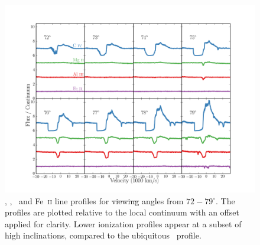 \documentclass[preprint, a4paper, 11pt]{aastex}
\providecommand{\DIFadd}[1]{{\protect\color{blue}\uwave{#1}}} %
\providecommand{\DIFdel}[1]{{\protect\color{red}\sout{#1}}}                      %
\providecommand{\DIFaddFL}[1]{\DIFadd{#1}} %
\providecommand{\DIFdelFL}[1]{\DIFdel{#1}} %
\providecommand{\DIFaddbeginFL}{} %
\providecommand{\DIFaddendFL}{} %
\providecommand{\DIFdelbeginFL}{} %
\providecommand{\DIFdelendFL}{} %
\begin{document}
\begin{figure} %
\centering
\includegraphics[width=1.0\textwidth]{figures/c4_angles.png}
\caption
{
\civ , \mg , \al\ and Fe~\textsc{ii} line profiles for \DIFdelbeginFL \DIFdelFL{viewing }\DIFdelendFL \DIFaddbeginFL \DIFaddFL{wind }\DIFaddendFL angles
from $72-79^\circ$. The profiles are plotted relative to the local
continuum with an offset applied for clarity. Lower ionization
profiles appear at a subset of high inclinations, compared
to the ubiquitous \civ\ profile.
}
\label{fig:lobal}
\end{figure} %
\end{document}
